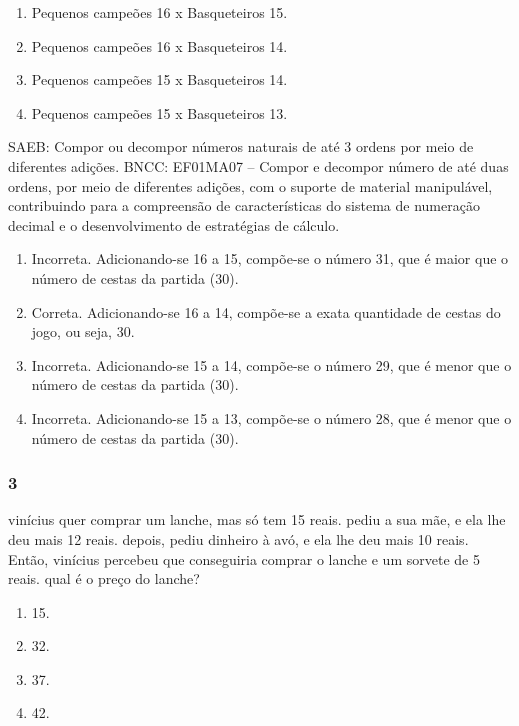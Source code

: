 \begin{enumerate}
\def\labelenumi{\Alph{enumi})}
\item
  Pequenos campeões 16 x Basqueteiros 15.
\item
  Pequenos campeões 16 x Basqueteiros 14.
\item
  Pequenos campeões 15 x Basqueteiros 14.
\item
  Pequenos campeões 15 x Basqueteiros 13.
\end{enumerate}

SAEB: Compor ou decompor números naturais de até 3 ordens por
meio de diferentes adições.
BNCC: EF01MA07 -- Compor e decompor número de até duas ordens, por meio
de diferentes adições, com o suporte de material manipulável,
contribuindo para a compreensão de características do sistema de
numeração decimal e o desenvolvimento de estratégias de cálculo.

\begin{enumerate}
\def\labelenumi{\alph{enumi})}
\item
  Incorreta. Adicionando-se 16 a 15, compõe-se o número 31, que é maior que o número de cestas da partida (30).
\item
  Correta. Adicionando-se 16 a 14, compõe-se a exata quantidade de cestas do
  jogo, ou seja, 30.
\item
  Incorreta. Adicionando-se 15 a 14, compõe-se o número 29, que é menor que o número de cestas da partida (30).
\item
  Incorreta. Adicionando-se 15 a 13, compõe-se o número 28, que é menor que o número de cestas da partida (30).
\end{enumerate}

\subsubsection{3}\label{section-25}

vinícius quer comprar um lanche, mas só tem 15 reais. pediu a sua mãe, e
ela lhe deu mais 12 reais. depois, pediu dinheiro à avó, e ela
lhe deu mais 10 reais. Então, vinícius percebeu que conseguiria comprar o lanche e um sorvete de 5 reais. qual é o preço do lanche?

\begin{enumerate}
\def\labelenumi{\Alph{enumi})}
\item
  15.
\item
  32.
\item
  37.
\item
  42.
\end{enumerate}

